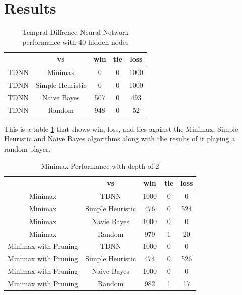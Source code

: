 \documentclass[12pt,letterpaper]{article}
\begin{document}
\clearpage
\newpage

\section{Results}

\begin{table}[h]
\begin{center}
\begin{tabular}{|c||c|c|c|c|}
\hline
& vs & win & tie & loss\\
\hline \hline
TDNN & Minimax & 0 & 0 & 1000\\
\hline 
TDNN & Simple Heuristic & 0 & 0 & 1000\\
\hline 
TDNN & Naive Bayes & 507 & 0 & 493\\
\hline 
TDNN & Random & 948 & 0 & 52\\
\hline 
\end{tabular}
\end{center}
\caption{Tempral Diffrence Neural Network performance with 40 hidden nodes}
\label{TDNNtable}
\end{table}

This is a table \ref{TDNNtable} that shows win, loss, and ties against the Minimax, Simple Heuristic and Naive Bayes algorithms along with the results of it playing a random player.

\begin{table}[h]
\begin{center}
\begin{tabular}{|c||c|c|c|c|}
\hline
& vs & win & tie & loss\\
\hline \hline
Minimax & TDNN & 1000 & 0 & 0\\
\hline 
Minimax & Simple Heuristic & 476 & 0 & 524\\
\hline 
Minimax & Navie Bayes & 1000 & 0 & 0\\
\hline 
Minimax & Random & 979 & 1 & 20\\
\hline 
Minimax with Pruning & TDNN & 1000 & 0 & 0\\
\hline 
Minimax with Pruning & Simple Heuristic & 474 & 0 & 526\\
\hline 
Minimax with Pruning & Naive Bayes & 1000 & 0 & 0\\
\hline 
Minimax with Pruning & Random & 982 & 1 & 17\\
\hline 
\end{tabular}
\end{center}
\caption{Minimax Performance with depth of 2}
\label{MinimaxTable}
\end{table}
\end{document}
